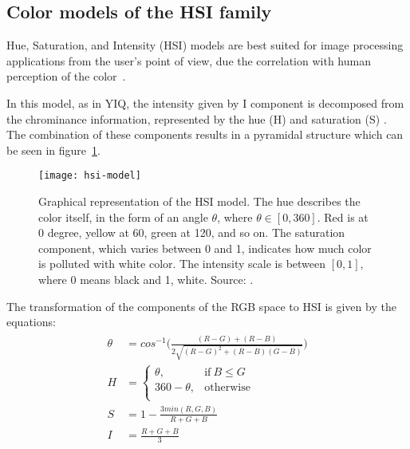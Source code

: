 \subsection{Color models of the HSI family}
\label{sec:modelo_cores_hsi}

Hue, Saturation, and Intensity (HSI) models are best suited for image processing applications from the user's point of view, due the correlation with human perception of the color~\citep{konstantinos:00}.

In this model, as in YIQ, the intensity given by I component is decomposed from the chrominance information, represented by the hue (H) and saturation (S) \citep{konstantinos:00}. The combination of these components results in a pyramidal structure which can be seen in figure~\ref{fig:hsi-model}.

\begin{figure}[!h]
  \centering
  \texttt{[image: hsi-model]}
  \caption[Graphical representation of the HSI model]{Graphical representation of the HSI model. The hue describes the color itself, in the form of an angle $\theta$, where $\theta \in [0, 360]$. Red is at 0 degree, yellow at 60, green at 120, and so on. The saturation component, which varies between 0 and 1, indicates how much color is polluted with white color. The intensity scale is between $[0, 1]$, where 0 means black and 1, white. Source: \citet{blackice:16}.}
  \label{fig:hsi-model} 
\end{figure}

The transformation of the components of the RGB space to HSI is given by the equations:
\begin{align}
\label{eq:rgb_para_hsi}
\begin{split}
  \theta &= cos^{-1} \bigg( \frac{(R - G) + (R - B)}{2 \sqrt{(R - G)^2 + (R - B)(G - B)}} \bigg)
  \\[0.5em]
  H &= \begin{cases}
            \theta,       & \text{if}\ B \leq G\\
            360 - \theta, & \text{otherwise}\\
       \end{cases}
  \\[0.5em]
  S &= 1 - \frac{3 min(R, G, B)}{R + G + B}
  \\[0.5em]
  I &= \frac{R + G + B}{3}
\end{split}
\end{align}


